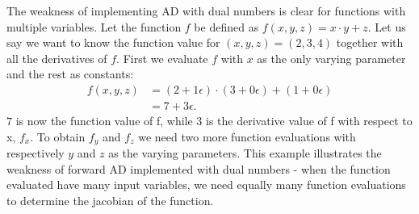 The weakness of implementing AD with dual numbers is clear for functions with multiple variables. Let the function $f$ be defined as $f(x,y,z) = x\cdot y + z$. Let us say we want to know the function value for $(x,y,z) = (2,3,4)$ together with all the derivatives of $f$. First we evaluate $f$ with $x$ as the only varying parameter and the rest as constants:
\begin{align*}
    f(x,y,z) &= (2+1\epsilon)\cdot(3+0\epsilon) + (1+0\epsilon)\\
        &=7+3\epsilon.
\end{align*}
$7$ is now the function value of f, while 3 is the derivative value of f with respect to x, $f_x$. To obtain $f_y$ and $f_z$ we need two more function evaluations with respectively $y$ and $z$ as the varying parameters. This example illustrates the weakness of forward AD implemented with dual numbers - when the function evaluated have many input variables, we need equally many function evaluations to determine the jacobian of the function.

